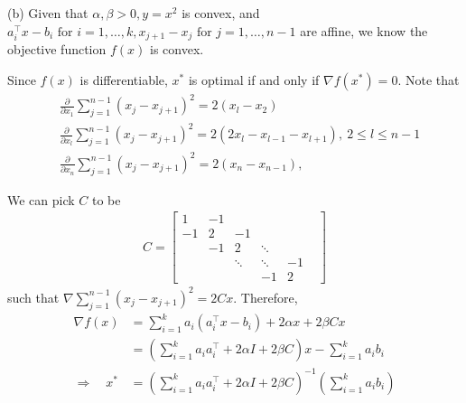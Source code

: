 \documentclass[11pt]{article}
\newcommand{\grad}{\nabla}
\newcommand{\T}{^\top}          %
\begin{document}
(b)
Given that $\alpha, \beta > 0, y=x^2$ is convex, and $a_i\T x - b_i \text{ for }i=1, \dots, k, x_{j+1} - x_j \text{ for } j = 1, \dots, n-1$ are affine, we know the objective function $f(x)$ is convex.

Since $f(x)$ is differentiable, $x^*$ is optimal if and only if $\grad f(x^*)=0$.
Note that
$$
\begin{aligned}
& \frac{\partial}{\partial x_1} \sum_{j=1}^{n-1}\left(x_j-x_{j+1}\right)^2=2\left(x_l-x_2\right) \\
& \frac{\partial}{\partial x_l} \sum_{j=1}^{n-1}\left(x_j-x_{j+1}\right)^2=2\left(2 x_l-x_{l-1}-x_{l+1}\right),\ 2 \leq l \leq n-1 \\
& \frac{\partial}{\partial x_n} \sum_{j=1}^{n-1}\left(x_j-x_{j+1}\right)^2=2\left(x_n-x_{n-1}\right),
\end{aligned}
$$

We can pick $C$ to be
\begin{align*}
  C =
  \begin{bmatrix}
     1 & -1 &    & & & \\
    -1 &  2 & -1 & & & \\
       & -1 & 2 & \ddots &&\\
       &    & \ddots &\ddots & -1\\
       &    &   & -1 & 2
  \end{bmatrix}
\end{align*}
such that $\grad \sum_{j=1}^{n-1}(x_j - x_{j+1})^2 = 2 C x$.
Therefore,
$$
\begin{aligned}
\nabla f(x) 
& =\sum_{i=1}^k a_i(a_i^{\top} x-b_i)+2 \alpha x+2 \beta C x \\
& =(\sum_{i=1}^k a_i a_i^{\top}+2 \alpha I+2 \beta C) x-\sum_{i=1}^k a_i b_i \\
\Rightarrow \quad x^* 
& =(\sum_{i=1}^k a_i a_i^{\top}+2 \alpha I+2 \beta C)^{-1}(\sum_{i=1}^k a_i b_i)
\end{aligned}
$$
\end{document}
